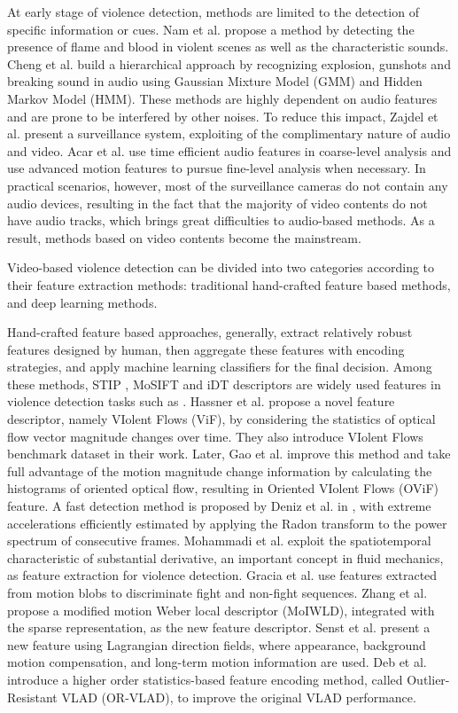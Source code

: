 \documentclass[10pt,twocolumn,letterpaper]{article}
\begin{document}
At early stage of violence detection, methods are limited to the detection of specific information or cues. 
Nam et al. \cite{nam1998audio} propose a method by detecting the presence of flame and blood in violent scenes as well as the characteristic sounds. 
Cheng et al. \cite{cheng2003semantic} build a  hierarchical approach by recognizing explosion, gunshots and breaking sound in audio using Gaussian Mixture Model (GMM) and Hidden Markov Model (HMM). 
These methods are highly dependent on audio features and are prone to be interfered by other noises. 
To reduce this impact, Zajdel et al. \cite{zajdel2007cassandra} present a surveillance system, exploiting of the complimentary nature of audio and video.
Acar et al. \cite{acar2016breaking} use time efficient audio features in coarse-level analysis and use advanced motion features to pursue fine-level analysis when necessary.
In practical scenarios, however, most of the surveillance cameras do not contain any audio devices, resulting in the fact that  the majority of video contents do not have audio tracks, which brings great difficulties to audio-based methods. 
As a result, methods based on video contents become the mainstream. 

Video-based violence detection can be divided into two categories according to their feature extraction methods:
traditional hand-crafted feature based methods, and deep learning methods.

Hand-crafted feature based approaches, generally, extract relatively robust features designed by human, then aggregate these features with encoding strategies, and apply machine learning classifiers for the final decision.
Among these methods, STIP \cite{STIPs}, MoSIFT \cite{MoSIFT} and iDT \cite{iDTs} descriptors are widely used features in violence detection tasks such as \cite{vio_sift, hockey, mosift_sc}.
Hassner et al. \cite{vif} propose a novel feature descriptor, namely VIolent Flows (ViF), by considering the statistics of optical flow vector magnitude changes over time. They also introduce VIolent Flows benchmark dataset in their work.
Later, Gao et al. \cite{ovif} improve this method and take full advantage of the motion magnitude change information by calculating the histograms of oriented optical flow, resulting in Oriented VIolent Flows (OViF) feature.
A fast detection method is proposed by Deniz et al. in \cite{fast}, with extreme accelerations efficiently estimated by applying the Radon transform to the power spectrum of consecutive frames.
Mohammadi et al. \cite{moha_avss} exploit the spatiotemporal characteristic of substantial derivative, an important concept in fluid mechanics, as feature extraction for violence detection.
Gracia et al. \cite{blob} use features extracted from motion blobs to discriminate fight and non-fight sequences. 
Zhang et al. \cite{MoIWLD} propose a modified motion Weber local descriptor (MoIWLD), integrated with the sparse representation, as the new feature descriptor.
Senst et al. \cite{lagrangian} present a new feature using Lagrangian direction fields, where appearance, background motion compensation, and long-term motion information are used.
Deb et al. \cite{vlad} introduce a higher order statistics-based feature encoding method, called Outlier-Resistant VLAD (OR-VLAD), to improve the original VLAD performance.
\end{document}
